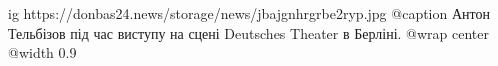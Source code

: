  
 
 
 
 

\ifcmt
  ig https://donbas24.news/storage/news/jbajgnhrgrbe2ryp.jpg
	@caption Антон Тельбізов під час виступу на сцені Deutsches Theater в Берліні.
  @wrap center
  @width 0.9
\fi
